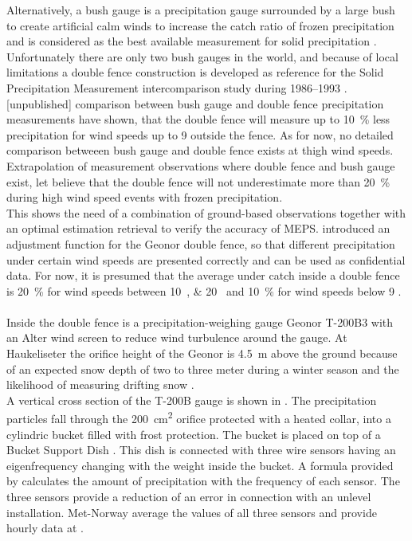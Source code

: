 Alternatively, a bush gauge is a precipitation gauge surrounded by a large bush to create artificial calm winds to increase the catch ratio of frozen precipitation and is considered as the best available measurement for solid precipitation \citep[unpublished]{wolff_wmo_2018}. Unfortunately there are only two bush gauges in the world, and because of local limitations a double fence construction is developed as reference for the Solid Precipitation Measurement intercomparison study during \numrange{1986}{1993} \citep{goodison_wmo_1998}. \citet{wolff_wmo_2018} [unpublished] comparison between bush gauge and double fence precipitation measurements have shown, that the double fence will measure up to \SI{10}{\percent} less precipitation for wind speeds up to \SI{9}{\mPs} outside the fence. As for now, no detailed comparison betweeen bush gauge and double fence exists at thigh wind speeds. Extrapolation of measurement observations where double fence and bush gauge exist, let believe that the double fence will not underestimate more than \SI{20}{\percent} during high wind speed events with frozen precipitation. 
\\
This shows the need of a combination of ground-based observations together with an optimal estimation retrieval to verify the accuracy of MEPS. \citet{wolff_derivation_2015} introduced an adjustment function for the Geonor double fence, so that different precipitation under certain wind speeds are presented correctly and can be used as confidential data. 
For now, it is presumed that the average under catch inside a double fence is \SI{20}{\percent} for wind speeds between \SIlist{10;20}{\mPs} and \SI{10}{\percent} for wind speeds below \SI{9}{\mPs} \citep[][unpublished]{wolff_wmo_2018}.
\\ \\
Inside the double fence is a precipitation-weighing gauge Geonor T-200B3 \citep[3-wire transducers, \SI{1000}{\mm},][]{geonor_inc._t-200b_2015} with an Alter wind screen to reduce wind turbulence around the gauge. At Haukeliseter the orifice height of the Geonor is \SI{4.5}{\metre} above the ground because of an expected snow depth of two to three meter during a winter season and the likelihood of measuring drifting snow \citep{wolff_measurements_2013,wolff_derivation_2015}. \\
A vertical cross section of the T-200B gauge is shown in . The precipitation particles fall through the \SI{200}{\square\cm} orifice protected with a heated collar, into a cylindric bucket filled with frost protection. The bucket is placed on top of a Bucket Support Dish \citep[,][]{geonor_inc._t-200b_2015}. This dish is connected with three wire sensors having an eigenfrequency changing with the weight inside the bucket. A formula provided by \citet{geonor_inc._t-200b_2015} calculates the amount of precipitation with the frequency of each sensor. The three sensors provide a reduction of an error in connection with an unlevel installation. Met-Norway average the values of all three sensors and provide hourly data at \citeauthor{eklima_norwegian_2016}.
